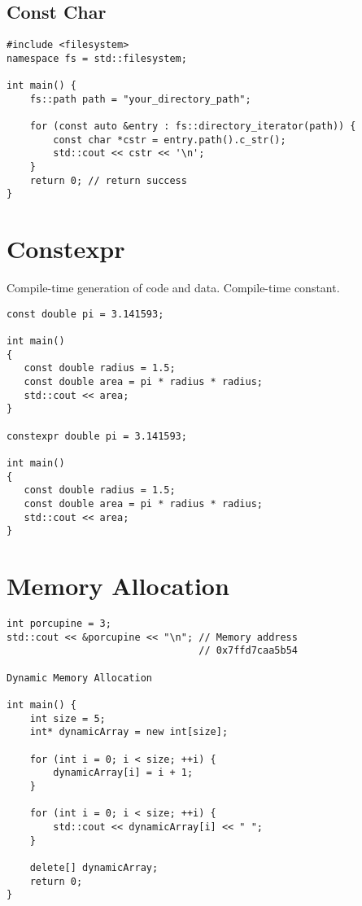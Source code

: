 \documentclass[openany]{report}
\begin{document}
\subsection{Const Char}

\begin{verbatim}
#include <filesystem>
namespace fs = std::filesystem;

int main() {
    fs::path path = "your_directory_path";

    for (const auto &entry : fs::directory_iterator(path)) {
        const char *cstr = entry.path().c_str();
        std::cout << cstr << '\n';
    }
    return 0; // return success
}
\end{verbatim}

\section{Constexpr}

Compile-time generation of code and data. Compile-time constant.

\begin{verbatim}
const double pi = 3.141593;

int main()
{
   const double radius = 1.5;
   const double area = pi * radius * radius;
   std::cout << area;
}

constexpr double pi = 3.141593;

int main()
{
   const double radius = 1.5;
   const double area = pi * radius * radius;
   std::cout << area;
}
\end{verbatim}

\section{Memory Allocation}

\begin{verbatim}
int porcupine = 3;
std::cout << &porcupine << "\n"; // Memory address
                                 // 0x7ffd7caa5b54

Dynamic Memory Allocation

int main() {
    int size = 5;
    int* dynamicArray = new int[size];

    for (int i = 0; i < size; ++i) {
        dynamicArray[i] = i + 1;
    }

    for (int i = 0; i < size; ++i) {
        std::cout << dynamicArray[i] << " ";
    }

    delete[] dynamicArray;
    return 0;
}
\end{verbatim}
\end{document}
